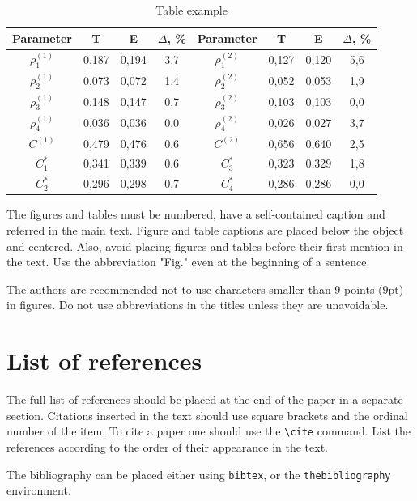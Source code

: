 \documentclass[11pt]{article}
\begin{document}
\begin{table}[ht!]\begin{center}
\begin{tabular}{|c||c|c|c||c||c|c|c|}\hline
  Parameter & T & E & $\Delta$, \% & Parameter & T & E & $\Delta$, \% \\ \hline \hline
  $\rho_{1}^{(1)}$ & 0,187 & 0,194 & 3,7 &  $\rho_{1}^{(2)}$ & 0,127 & 0,120 & 5,6 \\ \hline
  $\rho_{2}^{(1)}$ & 0,073 & 0,072 & 1,4 &  $\rho_{2}^{(2)}$ & 0,052 & 0,053 & 1,9 \\ \hline
  $\rho_{3}^{(1)}$ & 0,148 & 0,147 & 0,7 &  $\rho_{3}^{(2)}$ & 0,103 & 0,103 & 0,0 \\ \hline
  $\rho_{4}^{(1)}$ & 0,036 & 0,036 & 0,0 &  $\rho_{4}^{(2)}$ & 0,026 & 0,027 & 3,7 \\ \hline \hline
  $C^{(1)}$ & 0,479 & 0,476 & 0,6 & $C^{(2)}$ & 0,656 & 0,640 & 2,5 \\ \hline \hline
  $C_{1}^{*}$ & 0,341 & 0,339 & 0,6 & $C_{3}^{*}$ & 0,323 & 0,329 & 1,8 \\ \hline
  $C_{2}^{*}$ & 0,296 & 0,298 & 0,7 & $C_{4}^{*}$ & 0,286 & 0,286 & 0,0 \\ \hline
\end{tabular}\caption{Table example}\label{tab:sampletable}
\end{center}\end{table}

The figures and tables must be numbered, have a self-contained
caption and referred in the main text. Figure and table
captions are placed below the object and centered. Also, avoid
placing figures and tables before their first mention in the
text. Use the abbreviation "Fig." even at the beginning of a
sentence.

The authors are recommended not to use characters smaller than
9 points (9pt) in figures. Do not use abbreviations in the titles
unless they are unavoidable.

\section{List of references}
The full list of references should be placed at the end of the paper in a
separate section. Citations inserted in the text should use square
brackets and the ordinal number of the item. To cite a paper one should use the \verb"\cite" command.  List
the references according to the order of their appearance in
the text.

The bibliography can be placed either using \verb"bibtex", or the \verb"thebibliography" environment. 
\end{document}
